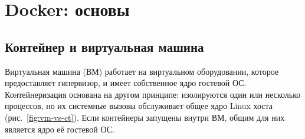 \chapter{Docker: основы}
\label{ch:19-docker-basics}
\begingroup
\setlength{\parskip}{0pt}
\setlength{\parindent}{1.25cm}
\makeatletter
\let\@afterindentfalse\@afterindenttrue
\@afterindenttrue
\makeatother
\setlength{\intextsep}{8pt plus 2pt minus 2pt}
\setlength{\textfloatsep}{10pt plus 2pt minus 2pt}
\raggedbottom
{}
\captionsetup[figure]{font=footnotesize,justification=centering,singlelinecheck=false}

\section{Контейнер и виртуальная машина}

Виртуальная машина (ВМ) работает на виртуальном оборудовании, которое предоставляет гипервизор, и имеет собственное ядро гостевой ОС. Контейнеризация основана на другом принципе: изолируются один или несколько процессов, но их системные вызовы обслуживает общее ядро Linux хоста (рис.~\ref*{fig:vm-vs-ct}). Если контейнеры запущены внутри ВМ, общим для них является ядро её гостевой ОС.

